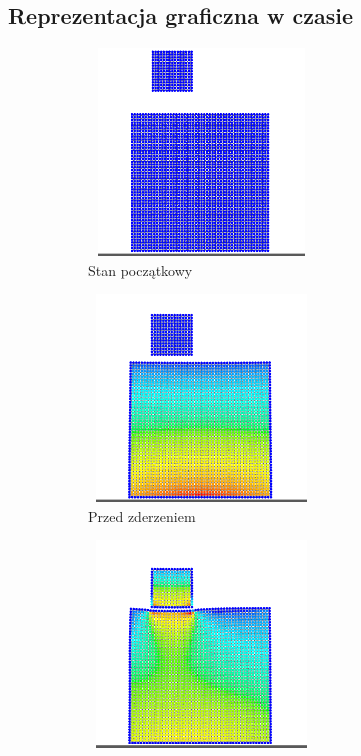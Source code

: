\documentclass[12pt, letterpaper]{report}
\begin{document}
    \subsection{Reprezentacja graficzna w czasie}

    \begin{figure}[h]

        \begin{subfigure}{0.5\textwidth}
            \centering
            \includegraphics[width=6cm, height=5.5cm]{pressure02_01} 
            \caption{Stan początkowy}
        \end{subfigure}
        \begin{subfigure}{0.5\textwidth}
            \centering
            \includegraphics[width=6cm, height=5.5cm]{pressure02_02}
            \caption{Przed zderzeniem}
        \end{subfigure}
        \begin{subfigure}{0.5\textwidth}
            \centering
            \includegraphics[width=6cm, height=5.5cm]{pressure02_03}

\end{subfigure}
\end{figure}
\end{document}

